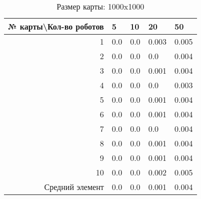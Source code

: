 \begin{table}[H]
\centering
\begin{tabular}{|r|l|l|l|l|}
\hline
№ карты\textbackslash Кол-во роботов & \textbf{5} & \textbf{10} & \textbf{20} & \textbf{50}\\ \hline
1 & 0.0 & 0.0 & 0.003 & 0.005\\ \hline
2 & 0.0 & 0.0 & 0.0 & 0.004\\ \hline
3 & 0.0 & 0.0 & 0.001 & 0.004\\ \hline
4 & 0.0 & 0.0 & 0.0 & 0.003\\ \hline
5 & 0.0 & 0.0 & 0.001 & 0.004\\ \hline
6 & 0.0 & 0.0 & 0.001 & 0.004\\ \hline
7 & 0.0 & 0.0 & 0.0 & 0.004\\ \hline
8 & 0.0 & 0.0 & 0.001 & 0.004\\ \hline
9 & 0.0 & 0.0 & 0.001 & 0.004\\ \hline
10 & 0.0 & 0.0 & 0.002 & 0.005\\ \hline
Средний элемент & 0.0 & 0.0 & 0.001 & 0.004\\ \hline
\end{tabular}
\caption*{Размер карты: 1000x1000}
\end{table}
